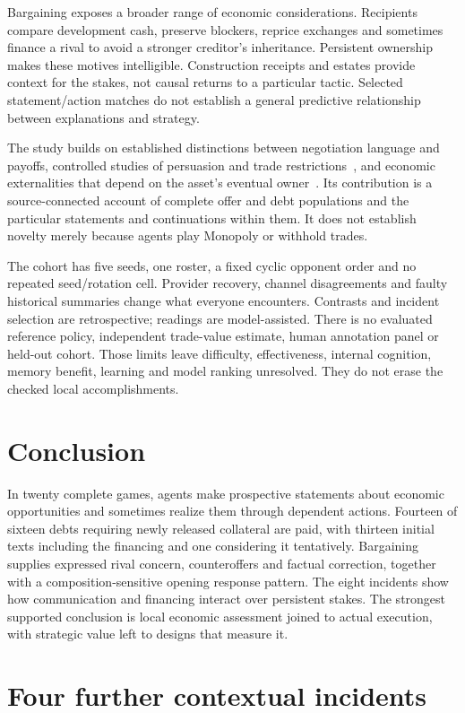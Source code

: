 \documentclass[11pt,letterpaper]{article}
\begin{document}
Bargaining exposes a broader range of economic considerations. Recipients compare development cash, preserve blockers, reprice exchanges and sometimes finance a rival to avoid a stronger creditor's inheritance. Persistent ownership makes these motives intelligible. Construction receipts and estates provide context for the stakes, not causal returns to a particular tactic. Selected statement/action matches do not establish a general predictive relationship between explanations and strategy.

The study builds on established distinctions between negotiation language and payoffs, controlled studies of persuasion and trade restrictions~\cite{guhe}, and economic externalities that depend on the asset's eventual owner~\cite{jehiel}. Its contribution is a source-connected account of complete offer and debt populations and the particular statements and continuations within them. It does not establish novelty merely because agents play Monopoly or withhold trades.

The cohort has five seeds, one roster, a fixed cyclic opponent order and no repeated seed/rotation cell. Provider recovery, channel disagreements and faulty historical summaries change what everyone encounters. Contrasts and incident selection are retrospective; readings are model-assisted. There is no evaluated reference policy, independent trade-value estimate, human annotation panel or held-out cohort. Those limits leave difficulty, effectiveness, internal cognition, memory benefit, learning and model ranking unresolved. They do not erase the checked local accomplishments.

\section{Conclusion}
In twenty complete games, agents make prospective statements about economic opportunities and sometimes realize them through dependent actions. Fourteen of sixteen debts requiring newly released collateral are paid, with thirteen initial texts including the financing and one considering it tentatively. Bargaining supplies expressed rival concern, counteroffers and factual correction, together with a composition-sensitive opening response pattern. The eight incidents show how communication and financing interact over persistent stakes. The strongest supported conclusion is local economic assessment joined to actual execution, with strategic value left to designs that measure it.

\appendix
\section{Four further contextual incidents}
\end{document}
